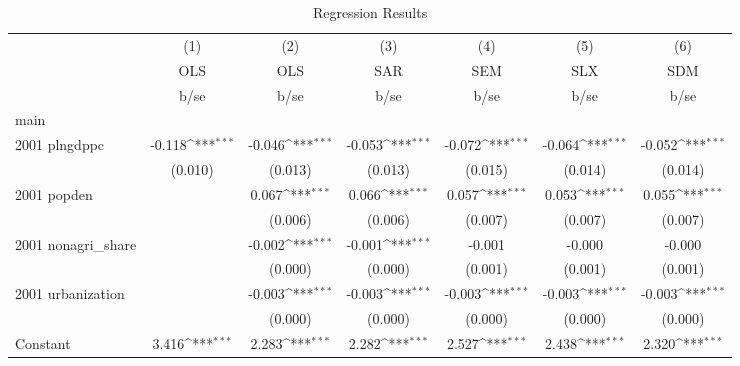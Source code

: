 \begin{table}[htbp]\centering
\def\sym#1{\ifmmode^{#1}\else\(^{#1}\)\fi}
\caption{Regression Results}
\begin{tabular}{l*{6}{c}}
\hline\hline
                    &\multicolumn{1}{c}{(1)}&\multicolumn{1}{c}{(2)}&\multicolumn{1}{c}{(3)}&\multicolumn{1}{c}{(4)}&\multicolumn{1}{c}{(5)}&\multicolumn{1}{c}{(6)}\\
                    &\multicolumn{1}{c}{OLS}&\multicolumn{1}{c}{OLS}&\multicolumn{1}{c}{SAR}&\multicolumn{1}{c}{SEM}&\multicolumn{1}{c}{SLX}&\multicolumn{1}{c}{SDM}\\
                    &        b/se         &        b/se         &        b/se         &        b/se         &        b/se         &        b/se         \\
\hline
main                &                     &                     &                     &                     &                     &                     \\
2001 plngdppc       &      -0.118\sym{***}&      -0.046\sym{***}&      -0.053\sym{***}&      -0.072\sym{***}&      -0.064\sym{***}&      -0.052\sym{***}\\
                    &     (0.010)         &     (0.013)         &     (0.013)         &     (0.015)         &     (0.014)         &     (0.014)         \\
2001 popden         &                     &       0.067\sym{***}&       0.066\sym{***}&       0.057\sym{***}&       0.053\sym{***}&       0.055\sym{***}\\
                    &                     &     (0.006)         &     (0.006)         &     (0.007)         &     (0.007)         &     (0.007)         \\
2001 nonagri\_share  &                     &      -0.002\sym{***}&      -0.001\sym{***}&      -0.001         &      -0.000         &      -0.000         \\
                    &                     &     (0.000)         &     (0.000)         &     (0.001)         &     (0.001)         &     (0.001)         \\
2001 urbanization   &                     &      -0.003\sym{***}&      -0.003\sym{***}&      -0.003\sym{***}&      -0.003\sym{***}&      -0.003\sym{***}\\
                    &                     &     (0.000)         &     (0.000)         &     (0.000)         &     (0.000)         &     (0.000)         \\
Constant            &       3.416\sym{***}&       2.283\sym{***}&       2.282\sym{***}&       2.527\sym{***}&       2.438\sym{***}&       2.320\sym{***}\\

\end{tabular}
\end{table}
